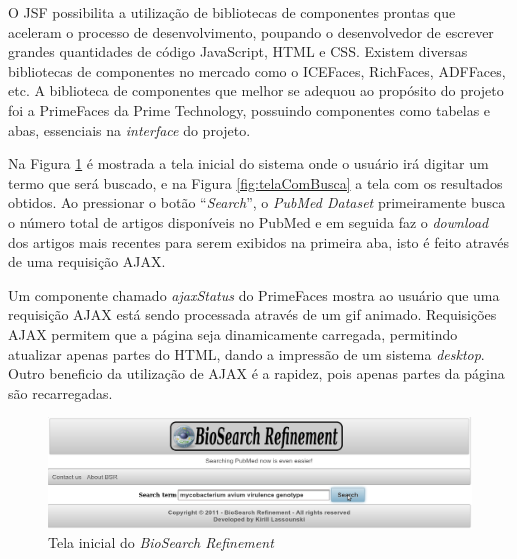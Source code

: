 O JSF possibilita a utilização de bibliotecas de componentes prontas que aceleram o processo de desenvolvimento, poupando o desenvolvedor de escrever grandes quantidades de código JavaScript, HTML e CSS. Existem diversas bibliotecas de componentes no mercado como o ICEFaces, RichFaces, ADFFaces, etc. A biblioteca de componentes que melhor se adequou ao propósito do projeto foi a PrimeFaces da Prime Technology, possuindo componentes como tabelas e abas, essenciais na \emph{interface} do projeto.

Na Figura \ref{fig:telaInicial} é mostrada a tela inicial do sistema onde o usuário irá digitar um termo que será buscado, e na Figura \ref{fig:telaComBusca} a tela com os resultados obtidos. Ao pressionar o botão “\emph{Search}”, o \emph{PubMed Dataset} primeiramente busca o número total de artigos disponíveis no PubMed e em seguida faz o \emph{download} dos artigos mais recentes para serem exibidos na primeira aba, isto é feito através de uma requisição AJAX. 

Um componente chamado \emph{ajaxStatus} do PrimeFaces mostra ao usuário que uma requisição AJAX está sendo processada através de um gif animado. Requisições AJAX permitem que a página seja dinamicamente carregada, permitindo atualizar apenas partes do HTML, dando a impressão de um sistema \emph{desktop}. Outro beneficio da utilização de AJAX é a rapidez, pois apenas partes da página são recarregadas.

\begin{figure}[h!]
    \center
    \includegraphics[scale=0.37]{imagens/telaInicial.png}
    \caption{Tela inicial do \emph{BioSearch Refinement} \label{fig:telaInicial}} 
\end{figure}

